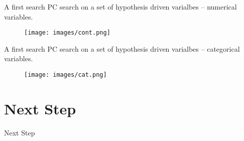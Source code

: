 \documentclass[10pt]{beamer} %
\begin{document}
\begin{frame}[plain]{A first search}
PC search on a set of hypothesis driven varialbes -- numerical variables.
\begin{figure}
\texttt{[image: images/cont.png]}
\end{figure}
\end{frame}

\begin{frame}[plain]{A first search}
PC search on a set of hypothesis driven varialbes -- categorical variables.
\begin{figure}
\texttt{[image: images/cat.png]}
\end{figure}
\end{frame}

\section{Next Step}
\begin{frame}[plain]{Next Step}

\end{frame}
\end{document}
